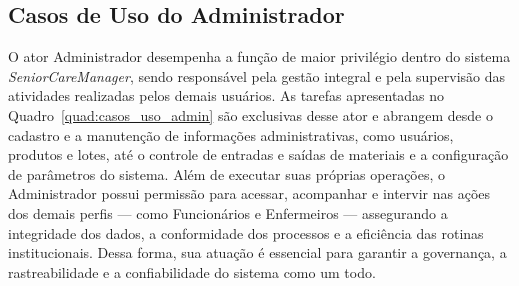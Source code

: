 \subsection{Casos de Uso do Administrador}

O ator Administrador desempenha a função de maior privilégio dentro do sistema \textit{SeniorCareManager}, sendo responsável pela gestão integral e pela supervisão das atividades realizadas pelos demais usuários. As tarefas apresentadas no Quadro~\ref{quad:casos_uso_admin} são exclusivas desse ator e abrangem desde o cadastro e a manutenção de informações administrativas, como usuários, produtos e lotes, até o controle de entradas e saídas de materiais e a configuração de parâmetros do sistema. Além de executar suas próprias operações, o Administrador possui permissão para acessar, acompanhar e intervir nas ações dos demais perfis — como Funcionários e Enfermeiros — assegurando a integridade dos dados, a conformidade dos processos e a eficiência das rotinas institucionais. Dessa forma, sua atuação é essencial para garantir a governança, a rastreabilidade e a confiabilidade do sistema como um todo.

